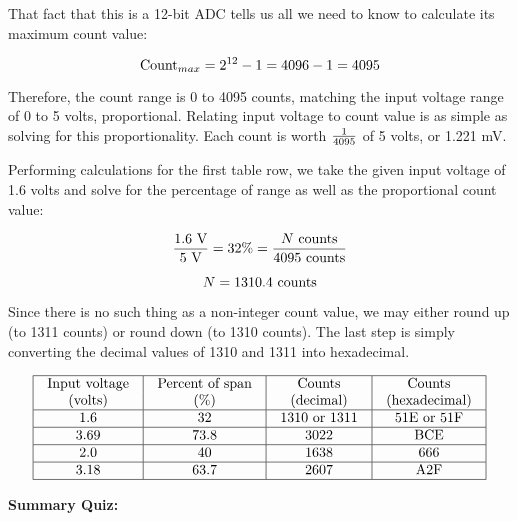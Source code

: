 





That fact that this is a 12-bit ADC tells us all we need to know to calculate its maximum count value:

$$\hbox{Count}_{max} = 2^{12} - 1 = 4096 - 1 = 4095$$

Therefore, the count range is 0 to 4095 counts, matching the input voltage range of 0 to 5 volts, proportional.  Relating input voltage to count value is as simple as solving for this proportionality.  Each count is worth ${1 \over 4095}$ of 5 volts, or 1.221 mV.

\vskip 10pt

Performing calculations for the first table row, we take the given input voltage of 1.6 volts and solve for the percentage of range as well as the proportional count value:

$${1.6 \hbox{ V} \over 5 \hbox{ V}} = 32\% = {N \hbox{ counts} \over 4095 \hbox{ counts}}$$

$$N = 1310.4 \hbox{ counts}$$

Since there is no such thing as a non-integer count value, we may either round up (to 1311 counts) or round down (to 1310 counts).  The last step is simply converting the decimal values of 1310 and 1311 into hexadecimal.


$$\vbox{\offinterlineskip
\halign{\strut
\vrule \quad\hfil # \ \hfil & 
\vrule \quad\hfil # \ \hfil & 
\vrule \quad\hfil # \ \hfil & 
\vrule \quad\hfil # \ \hfil \vrule \cr
\noalign{\hrule}
%
Input voltage & Percent of span & Counts & Counts \cr
%
(volts) & (\%) & (decimal) & (hexadecimal) \cr
%
\noalign{\hrule}
%
1.6 & 32 & 1310 or 1311 & 51E or 51F \cr
%
\noalign{\hrule}
%
3.69 & 73.8 & 3022 & BCE \cr
%
\noalign{\hrule}
%
2.0 & 40 & 1638 & 666 \cr
%
\noalign{\hrule}
%
3.18 & 63.7 & 2607 & A2F \cr
%
\noalign{\hrule}
} %
}$$ %












\vfil \eject

\noindent
{\bf Summary Quiz:}

